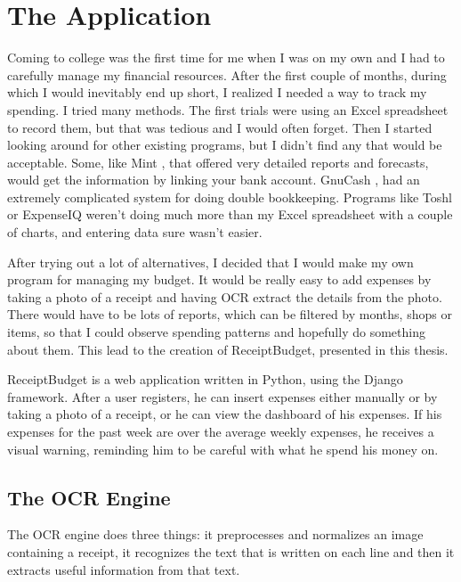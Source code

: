 \chapter{The Application}
\label{chap:application}

Coming to college was the first time for me when I was on my own and I had to carefully manage my financial resources. After the first couple of months, during which I would inevitably end up short, I realized I needed a way to track my spending. I tried many methods. The first trials were using an Excel spreadsheet to record them, but that was tedious and I would often forget. Then I started looking around for other existing programs, but I didn't find any that would be acceptable. Some, like Mint \cite{mint}, that offered very detailed reports and forecasts, would get the information by linking your bank account. GnuCash \cite{gnucash}, had an extremely complicated system for doing double bookkeeping. Programs like Toshl \cite{toshl} or ExpenseIQ \cite{expenseiq} weren't doing much more than my Excel spreadsheet with a couple of charts, and entering data sure wasn't easier. 

After trying out a lot of alternatives, I decided that I would make my own program for managing my budget. It would be really easy to add expenses by taking a photo of a receipt and having OCR extract the details from the photo. There would have to be lots of reports, which can be filtered by months, shops or items, so that I could observe spending patterns and hopefully do something about them. This lead to the creation of ReceiptBudget, presented in this thesis. 

ReceiptBudget is a web application written in Python, using the Django framework. After a user registers, he can insert expenses either manually or by taking a photo of a receipt, or he can view the dashboard of his expenses. If his expenses for the past week are over the average weekly expenses, he receives a visual warning, reminding him to be careful with what he spend his money on. 

\section{The OCR Engine}
The OCR engine does three things: it preprocesses and normalizes an image containing a receipt, it recognizes the text that is written on each line and then it extracts useful information from that text. 

